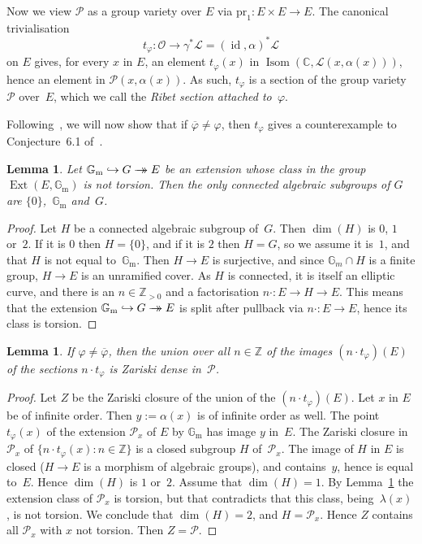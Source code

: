 \documentclass[JEP,XML,SOM,Unicode,NoFloatCountersInSection]{cedram}
\let\mathcal\mathscr
\def\hto{\mathrel{\lhook\joinrel\to}}
\newcommand{\onto}{\mathchoice{\to\hspace*{-5mm}\to}{\to\hspace*{-2.85mm}\to}{\to\hspace*{-3mm}\to}{\to\hspace*{-3mm}\to}}
\theoremstyle{plain}
\newtheorem{Lemma}[subsection]{Lemma}
\theoremstyle{definition}
\numberwithin{equation}{subsection}
\let\ol\overline
\let\phi\varphi
\renewcommand{\C}{\mathbb C}
\newcommand{\Z}{\mathbb Z}
\renewcommand{\G}{\mathbb G}
\newcommand{\calL}{\mathcal{L}}
\newcommand{\calO}{\mathcal{O}}
\newcommand{\calP}{\mathcal{P}}
\newcommand{\Gm}{\G_{\mathrm{m}}}
\newcommand{\pr}{\mathrm{pr}}
\DeclareMathOperator{\id}{id}
\DeclareMathOperator{\Isom}{Isom}
\DeclareMathOperator{\Ext}{Ext}
\begin{document}
Now we view $\calP$ as a group variety over $E$ via $\pr_1\colon
E\times E\to E$.
The canonical trivialisation
\begin{equation}\label{eq:def_t_phi}
t_\phi\colon\calO\to\gamma^*\calL = (\id,\alpha)^*\calL
\end{equation}
on $E$ gives, for every $x$ in $E$, an element $t_\phi(x)$ in
$\Isom(\C,\calL(x,\alpha(x)))$, hence an element in
$\calP(x,\alpha(x))$. As such, $t_\phi$ is a section of the group variety
$\calP$ over~$E$, which we call the \emph{Ribet section attached
to~$\phi$}.

Following~\cite{Bertrand11}, we will now show that if
$\ol{\phi}\neq\phi$, then $t_\phi$ gives a
counterexample to Conjecture~6.1 of~\cite{Pink2}.

\begin{Lemma}\label{lemma:fewsubgroups}
Let $\Gm\hto G \onto E$ be an extension whose
class in the group $\Ext(E,\Gm)$ is not torsion. Then the only connected
algebraic subgroups of $G$ are $\{0\}$,~$\Gm$ and~$G$.
\end{Lemma}
\begin{proof}
Let $H$ be a connected algebraic subgroup of~$G$. Then $\dim(H)$ is
$0$, $1$ or~$2$. If it is $0$ then $H=\{0\}$, and if it is $2$ then
$H=G$, so we assume it is~$1$, and that $H$ is not equal
to~$\Gm$. Then $H\to E$ is surjective, and since $\G_m \cap H$ is a
finite group, $H\to E$ is an unramified cover. As $H$ is connected,
it is itself an elliptic curve, and there is an $n\in\Z_{>0}$ and a
factorisation $n{\cdot}\colon E\to H\to E$. This means that the
extension $\Gm\hto G\onto E$ is split after
pullback via $n{\cdot}\colon E\to E$, hence its class is torsion.
\end{proof}

\begin{Lemma}\label{lemma:tgeneric}
If $\phi\neq\ol{\phi}$, then the union over all $n\in\Z$ of the
images $(n{\cdot}t_\phi)(E)$ of the sections $n{\cdot}t_\phi$ is
Zariski dense in~$\calP$.
\end{Lemma}
\begin{proof}
Let $Z$ be the Zariski closure of the union of the
$(n{\cdot}t_\phi)(E)$. Let $x$ in $E$ be of infinite order. Then
$y:=\alpha(x)$ is of infinite order as well. The point $t_\phi(x)$
of the extension $\calP_x$ of $E$ by $\Gm$ has image $y$ in~$E$. The
Zariski closure in $\calP_x$ of $\{n{\cdot}t_\phi(x) : n\in\Z\}$ is
a closed subgroup $H$ of~$\calP_x$. The image of $H$ in $E$ is
closed ($H\to E$ is a morphism of algebraic groups), and
contains~$y$, hence is equal to~$E$. Hence $\dim(H)$ is $1$
or~$2$. Assume that $\dim(H)=1$. By Lemma~\ref{lemma:fewsubgroups}
the extension class of $\calP_x$ is torsion, but that contradicts
that this class, being~$\lambda(x)$, is not torsion. We conclude
that $\dim(H)=2$, and $H=\calP_x$. Hence $Z$ contains all $\calP_x$
with $x$ not torsion. Then $Z=\calP$.
\end{proof}
\end{document}
